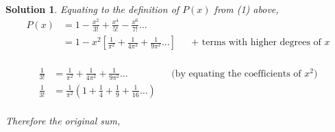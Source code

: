 \documentclass{article}
\newtheorem*{solution*}{Solution}
\begin{document}
\begin{solution*}
    Equating to the definition of $P(x)$ from (1) above,\\

    \begin{align*}        
        P(x) &= 1-\frac{x^2}{3!}+\frac{x^4}{5!}-\frac{x^6}{7!}\dots\\
            &= 1 - x^2 [
                \frac{1}{\pi^2}
                +\frac{1}{4\pi^2}
                +\frac{1}{9\pi^2}\dots]
            &&\text{+ terms with higher degrees of $x$}\\
    \end{align*}

    \begin{align*}        
        \frac{1}{3!} &= 
            \frac{1}{\pi^2}
            +\frac{1}{4\pi^2}
            +\frac{1}{9\pi^2}\dots
        &&\text{(by equating the coefficients of $x^2$)}\\
        \frac{1}{3!} &= 
            \frac{1}{\pi^2}(1
            +\frac{1}{4}
            +\frac{1}{9}
            +\frac{1}{16}\dots
            )\\
    \end{align*}
    
    Therefore the original sum,
    \begin{center}
    \end{center}
\end{solution*}
\end{document}
